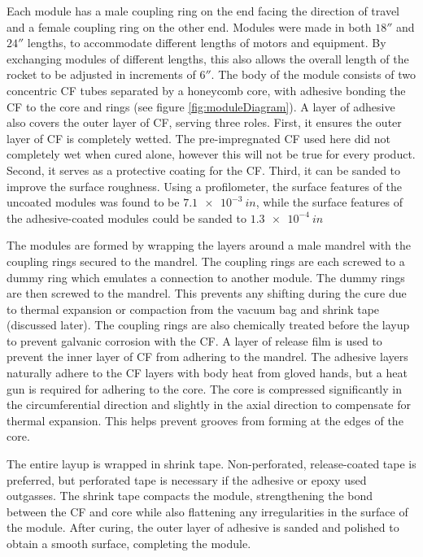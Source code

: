 \documentclass{aiaa-tc}%
\begin{document}
Each module has a male coupling ring on the end facing the direction of travel and a female coupling ring on the other end. 
Modules were made in both $18''$ and $24''$ lengths, to accommodate different lengths of motors and equipment. 
By exchanging modules of different lengths, this also allows the overall length of the rocket to be adjusted in increments of $6''$.
The body of the module consists of two concentric CF tubes separated by a honeycomb core, with adhesive bonding the CF to the core and rings (see figure \ref{fig:moduleDiagram}). 
A layer of adhesive also covers the outer layer of CF, serving three roles. First, it ensures the outer layer of CF is completely wetted. 
The pre-impregnated CF used here did not completely wet when cured alone, however this will not be true for every product.
Second, it serves as a protective coating for the CF. 
Third, it can be sanded to improve the surface roughness.
Using a profilometer, the surface features of the uncoated modules was found to be $\SI{7.1e-3}{in}$, while the surface features of the adhesive-coated modules could be sanded to $\SI{1.3e-4}{in}$

The modules are formed by wrapping the layers around a male mandrel with the coupling rings secured to the mandrel.
The coupling rings are each screwed to a dummy ring which emulates a connection to another module. The dummy rings are then screwed to the mandrel.
This prevents any shifting during the cure due to thermal expansion or compaction from the vacuum bag and shrink tape (discussed later).
The coupling rings are also chemically treated before the layup to prevent galvanic corrosion with the CF.
A layer of release film is used to prevent the inner layer of CF from adhering to the mandrel. 
The adhesive layers naturally adhere to the CF layers with body heat from gloved hands, but a heat gun is required for adhering to the core. 
The core is compressed significantly in the circumferential direction and slightly in the axial direction to compensate for thermal expansion. This helps prevent grooves from forming at the edges of the core.

The entire layup is wrapped in shrink tape. Non-perforated, release-coated tape is preferred, but perforated tape is necessary if the adhesive or epoxy used outgasses.
The shrink tape compacts the module, strengthening the bond between the CF and core while also flattening any irregularities in the surface of the module. 
After curing, the outer layer of adhesive is sanded and polished to obtain a smooth surface, completing the module. 
\end{document}
